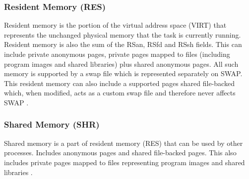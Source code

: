\subsubsection{Resident Memory (RES)}


Resident memory is the portion of the virtual address space (VIRT) that represents the unchanged physical memory that the task is currently running. Resident memory is also the sum of the RSan, RSfd and RSsh fields. This can include private anonymous pages, private pages mapped to files (including program images and shared libraries) plus shared anonymous pages. All such memory is supported by a swap file which is represented separately on SWAP. This resident memory can also include a supported pages shared file-backed which, when modified, acts as a custom swap file and therefore never affects SWAP \cite{manual:linux}.

\subsubsection{Shared Memory (SHR)}


Shared memory is a part of resident memory (RES) that can be used by other processes. Includes anonymous pages and shared file-backed pages. This also includes private pages mapped to files representing program images and shared libraries \cite{manual:linux}.


